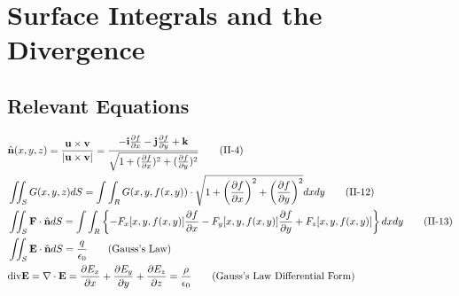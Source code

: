 \documentclass{article}
\begin{document}
\section{Surface Integrals and the Divergence}
\subsection*{Relevant Equations}
\begin{align*}
    &\hat{\textbf{n}}(x,y,z) = \frac{\textbf{u} \times \textbf{v}}{|\textbf{u} \times \textbf{v}|} = \frac{-\textbf{i}\frac{\partial{f}}{\partial{x}} -\textbf{j}\frac{\partial{f}}{\partial{y}} + \textbf{k}} {\sqrt{1 + (\frac{\partial{f}}{\partial{x}})^2 + (\frac{\partial{f}}{\partial{y}})^2 }} \tag{II-4} \\
    &\iint_S{G(x,y,z)}dS = \int\int_R{G(x,y,f(x,y))} \cdot \sqrt{1 + {\left( \frac{\partial{f}}{\partial{x}} \right)}^2 + {\left( \frac{\partial{f}}{\partial{y}} \right)}^2}dxdy \tag{II-12} \\
    &\iint_S \textbf{F} \cdot \hat{\textbf{n}} dS = \int\int_R \left\{ -F_x[x,y,f(x,y)]\frac{\partial{f}}{\partial{x}} - F_y[x,y,f(x,y)]\frac{\partial{f}}{\partial{y}} + F_z[x,y,f(x,y)] \right\} dxdy \tag{II-13}\label{II-13} \\
    &\iint_S \textbf{E} \cdot \hat{\textbf{n}} dS = \frac{q}{\epsilon_0} \tag{Gauss's Law}\label{Gauss} \\
    &\textnormal{div} \textbf{E} = \nabla \cdot \textbf{E} = \frac{\partial{E_x}}{\partial{x}} + \frac{\partial{E_y}}{\partial{y}} + \frac{\partial{E_z}}{\partial{z}} = \frac{\rho}{\epsilon_0} \tag{Gauss's Law Differential Form} \\
\end{align*}
\end{document}
